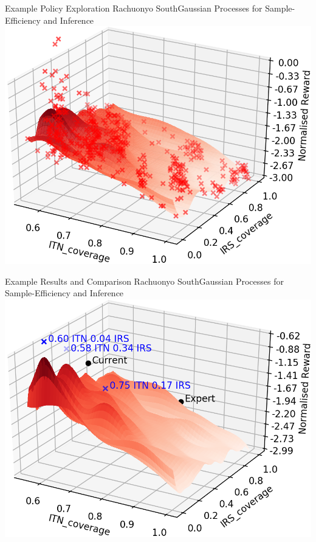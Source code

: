 \documentclass{beamer}
\begin{document}
\begin{frame}{Example Policy Exploration Rachuonyo South}{Gaussian Processes for Sample-Efficiency and Inference}
\centering
\includegraphics[width=1\textheight]{images/Batch_7.png}
\end{frame}
\begin{frame}{Example Results and Comparison Rachuonyo South}{Gaussian Processes for Sample-Efficiency and Inference}
\centering
\includegraphics[width=1\textheight]{images/UpdateOverview.png}
\end{frame}
\end{document}
